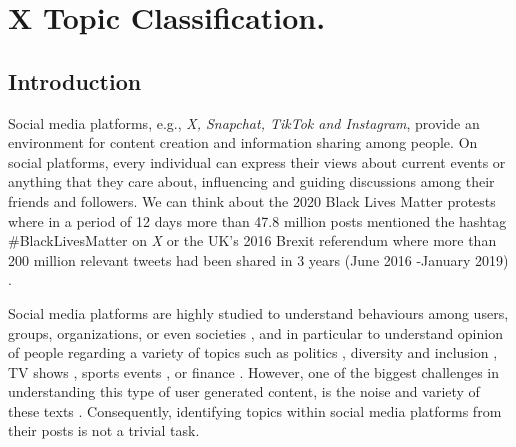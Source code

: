 \chapter{X Topic Classification.}
\label{ch:tweet-topic}



\section{Introduction}

Social media platforms, e.g., \textit{X, Snapchat, TikTok and Instagram}, provide an environment for content creation and information sharing among people. On social platforms, every individual can express their views about current events or anything that they care about, influencing and guiding discussions among their friends and followers.  We can think about the 2020 Black Lives Matter protests where in a period of 12 days more than 47.8 million posts mentioned the hashtag \#BlackLivesMatter on \textit{X} \cite{anderson2020blacklivesmatter} or the UK's 2016 Brexit referendum where more than 200 million relevant tweets had been shared in 3 years (June 2016 -January 2019) \cite{thenationalThisMany}.

Social media platforms are highly studied to understand behaviours among users, groups, organizations, or even societies \cite{Yang_Wang_Pierce_Vaish_Shi_Shah_2021}, and in particular to understand opinion of people regarding a variety of topics such as politics \cite{zhuravskaya2020political}, diversity and inclusion \cite{chakravarthi2020hopeedi}, TV shows \cite{wohn2011tweeting}, sports events \cite{lim2015social}, or finance \cite{hu2021rise}.
However, one of the biggest challenges in understanding this type of user generated content, is the noise and variety of these texts \cite{morgan2014information,baldwin2013noisy}. Consequently, identifying topics within social media platforms from their posts is not a trivial task.

